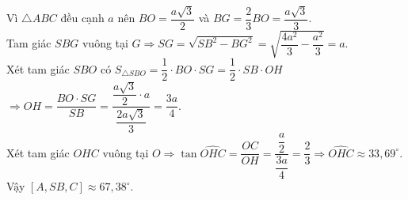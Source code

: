 \begin{bt}
{	Vì $\triangle ABC$ đều cạnh $a$ nên $BO=\dfrac{a\sqrt{3}}{2}$ và $BG=\dfrac{2}{3}BO=\dfrac{a\sqrt{3}}{3}$.\\
	Tam giác $SBG$ vuông tại $G\Rightarrow SG=\sqrt{SB^2-BG^2}=\sqrt{\dfrac{4a^2}{3}-\dfrac{a^2}{3}}=a$.\\
	Xét tam giác $SBO$ có $S_{\triangle SBO}=\dfrac{1}{2}\cdot BO\cdot SG=\dfrac{1}{2}\cdot SB\cdot OH$\\
	$\Rightarrow OH=\dfrac{BO\cdot SG}{SB}=\dfrac{\dfrac{a\sqrt{3}}{2}\cdot a}{\dfrac{2a\sqrt{3}}{3}}=\dfrac{3a}{4}$.\\
	Xét tam giác $OHC$ vuông tại $O\Rightarrow \tan\widehat{OHC}=\dfrac{OC}{OH}=\dfrac{\dfrac{a}{2}}{\dfrac{3a}{4}}=\dfrac{2}{3}\Rightarrow \widehat{OHC}\approx 33{,}69^\circ$.\\
	Vậy $[A,SB,C]\approx 67{,}38^\circ$.
	}
\end{bt}